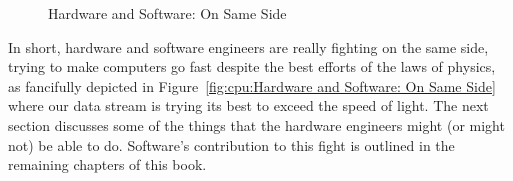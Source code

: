 \begin{figure}[tb]
\begin{center}
\end{center}
\caption{Hardware and Software: On Same Side}
\end{figure}

In short, hardware and software engineers are really fighting on the same
side, trying to make computers go fast despite the best efforts of the
laws of physics, as fancifully depicted in
Figure~\ref{fig:cpu:Hardware and Software: On Same Side}
where our data stream is trying its best to exceed the speed of light.
The next section discusses some of the things that the hardware engineers
might (or might not) be able to do.
Software's contribution to this fight is outlined in the remaining chapters
of this book.
